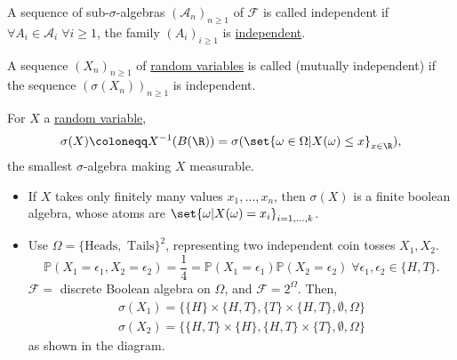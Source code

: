\documentclass{article}
\newcommand{\1}[1]{\mathbbm{1}_{#1}}
\newcommand{\Prob}{\mathbb{P}}
\begin{document}
\begin{defi}
    A sequence of sub-$\sigma$-algebras $(\mathcal{A}_n)_{n \geq 1}$ of $\mathcal{F}$ is called independent if $\forall A_i \in \mathcal{A}_i \; \forall i \geq 1$, the family $(A_i)_{i \geq 1}$ is \hyperlink{def:independentEvents}{independent}.
\end{defi}

\begin{defi}
    A sequence $(X_n)_{n \geq 1}$ of \hyperlink{def:rv}{random variables} is called (mutually independent) if the sequence $(\sigma(X_n))_{n \geq 1}$ is independent.
\end{defi}

\begin{notation}
    For $X$ a \hyperlink{def:rv}{random variable},
    \begin{equation*}
        \sigma(X) \coloneqq X^{-1}(B(\R)) = \sigma(\set{\omega \in \Omega | X(\omega) \leq x}_{x \in \R}),
    \end{equation*}
    the smallest $\sigma$-algebra making $X$ measurable.
\end{notation}

\begin{eg}
    \leavevmode
    \begin{itemize}
        \item If $X$ takes only finitely many values $x_1, \dotsc, x_n$, then $\sigma(X)$ is a finite boolean algebra, whose atoms are $\set{\omega | X(\omega) = x_i}_{i=1,\dotsc,k}$.
        \item Use $\Omega=\{\text{Heads}, \text{ Tails}\}^2$, representing two independent coin tosses $X_1, X_2$.
            \begin{equation*}
                \Prob(X_1 = \epsilon_1, X_2 = \epsilon_2) = \frac{1}{4} = \Prob(X_1 = \epsilon_1) \Prob(X_2 = \epsilon_2) \; \forall \epsilon_1, \epsilon_2 \in \{H, T\}.
            \end{equation*}
            $\mathcal{F}=$ discrete Boolean algebra on $\Omega$, and $\mathcal{F}=2^\Omega$. Then,
            \begin{align*}
                \sigma(X_1)= \{\{H\} \times \{H, T\}, \{T\} \times \{H, T\}, \emptyset, \Omega\} \\
                \sigma(X_2)= \{\{H, T\} \times \{H\}, \{H, T\} \times \{T\}, \emptyset, \Omega\}
            \end{align*}
            as shown in the diagram.
    \end{itemize}
\end{eg}
\end{document}
